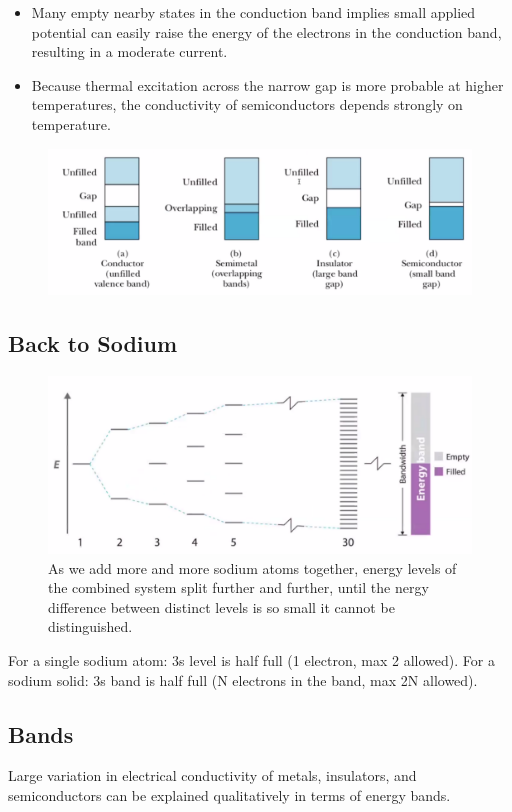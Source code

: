 \documentclass[class=article,crop=false]{standalone}
\begin{document}
\begin{itemize}
	\item Many empty nearby states in the conduction band implies small applied potential can easily raise the energy of the electrons in the conduction band, resulting in a moderate current.
	\item Because thermal excitation across the narrow gap is more probable at higher temperatures, the conductivity of semiconductors depends strongly on temperature.
\end{itemize}

\begin{figure}[h!]
	\centering
	\includegraphics[width=.8\linewidth]{./Images/in_summary.png}
	\caption{}
\end{figure}

\subsection{Back to Sodium}


\begin{figure}[h!]
	\centering
	\includegraphics[width=.8\linewidth]{./Images/band_cont.png}
	\caption{As we add more and more sodium atoms together, energy levels of the combined system split further and further, until the nergy difference between distinct levels is so small it cannot be distinguished.}
\end{figure}

For a single sodium atom: 3s level is half full (1 electron, max 2 allowed).
For a sodium solid: 3s band is half full (N electrons in the band, max 2N allowed).

\subsection{Bands}
Large variation in electrical conductivity of metals, insulators, and semiconductors can be explained qualitatively in terms of energy bands.
\end{document}
